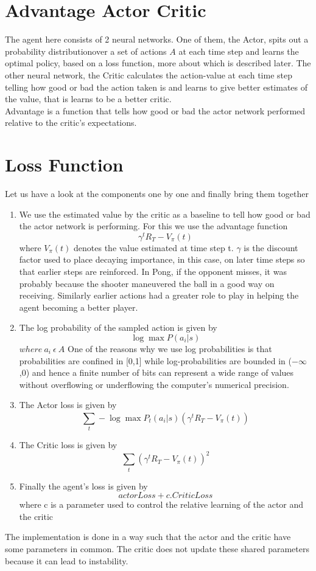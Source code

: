 \documentclass[12pt,a4]{article}
\begin{document}
\section*{Advantage Actor Critic}
The agent here consists of 2 neural networks. One of them, the Actor, spits out a probability distributionover a set of actions \(A\) at each time step and learns the optimal policy, based on a loss function, more about which is described later. The other neural network, the Critic calculates the action-value at each time step telling how good or bad the action taken is and learns to give better estimates of the value, that is learns to be a better critic.\\
Advantage is a function that tells how good or bad the actor network performed relative to the critic's expectations.
\pagebreak
\section*{Loss Function}
Let us have a look at the components one by one and finally bring them together
\begin{enumerate}
\item We use the estimated value by the critic as a baseline to tell how good or bad the actor network is performing. For this we use the advantage function
\[\gamma ^{t}R_{T} - V_{\pi}(t)\]
where \(V_{\pi}(t)\) denotes the value estimated at time step t. \(\gamma\) is the discount factor used to place decaying importance, in this case, on later time steps so that earlier steps are reinforced. In Pong, if the opponent misses, it was probably because the shooter maneuvered the ball in a good way on receiving. Similarly earlier actions had a greater role to play in helping the agent becoming a better player.

\item The log probability of the sampled action is given by
\[\log \max P(a_{i}|s)\] \(where\ a_{i}\ \epsilon\ A\)
One of the reasons why we use log probabilities is that probabilities are confined in [0,1] while log-probabilities are bounded in (\(-\infty\),0) and hence a finite number of bits can represent a wide range of values without overflowing or underflowing the computer's numerical precision.   
\item The Actor loss is given by
\[\sum_{t}^{}-\log \max P_{t}(a_{i}|s)(\gamma ^{t}R_{T} - V_{\pi}(t))\]
\item The Critic loss is given by
\[\sum_{t}(\gamma ^{t}R_{T} - V_{\pi}(t))^{2}\]
\item Finally the agent's loss is given by
\[actorLoss + c.CriticLoss\]
where c is a parameter used to control the relative learning of the actor and the critic
\end{enumerate}
The implementation is done in a way such that the actor and the critic have some parameters in common. The critic does not update these shared parameters because it can lead to instability.
\end{document}

